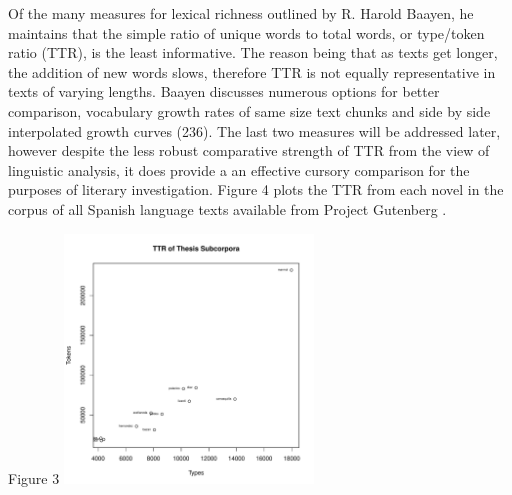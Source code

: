 \documentclass[12pt]{report}
\newenvironment{knitrout}{}{} %
\begin{document}
Of the many measures for lexical richness outlined by R. Harold Baayen, he maintains that the simple ratio of unique words to total words, or type/token ratio (TTR), is the least informative. 
The reason being that as texts get longer, the addition of new words slows, therefore TTR is not equally representative in texts of varying lengths. 
Baayen discusses numerous options for better comparison, vocabulary growth rates of same size text chunks and side by side interpolated growth curves (236)\nocite{Baayen2008}.
The last two measures will be addressed later, however despite the less robust comparative strength of TTR from the view of linguistic analysis, it does provide a an effective cursory comparison for the purposes of literary investigation. 
Figure 4 plots the TTR from each novel in the corpus of all Spanish language texts available from Project Gutenberg \autocite{Project G}.



Figure 3
\begin{knitrout}
\color{fgcolor}
\includegraphics[width=250,height=250]{figure/Figure_3-1} 

\end{knitrout}
\end{document}
